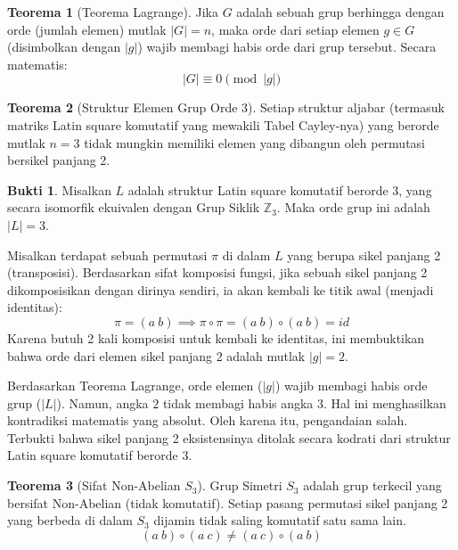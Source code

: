 \documentclass{article}
\theoremstyle{definition}
\newtheorem{teorema}{Teorema}
\newtheorem*{bukti}{Bukti}
\begin{document}
\begin{teorema}[Teorema Lagrange]
  Jika $G$ adalah sebuah grup berhingga dengan orde (jumlah elemen) mutlak $|G| = n$, maka orde dari setiap elemen $g \in G$ (disimbolkan dengan $|g|$) wajib membagi habis orde dari grup tersebut. Secara matematis:
  $$|G| \equiv 0 \pmod{|g|}$$
\end{teorema}

\begin{teorema}[Struktur Elemen Grup Orde 3]
  Setiap struktur aljabar (termasuk matriks Latin square komutatif yang mewakili Tabel Cayley-nya) yang berorde mutlak $n=3$ tidak mungkin memiliki elemen yang dibangun oleh permutasi bersikel panjang 2.
\end{teorema}

\begin{bukti}
  Misalkan $L$ adalah struktur Latin square komutatif berorde 3, yang secara isomorfik ekuivalen dengan Grup Siklik $\mathbb{Z}_3$. Maka orde grup ini adalah $|L| = 3$.

  Misalkan terdapat sebuah permutasi $\pi$ di dalam $L$ yang berupa sikel panjang 2 (transposisi). Berdasarkan sifat komposisi fungsi, jika sebuah sikel panjang 2 dikomposisikan dengan dirinya sendiri, ia akan kembali ke titik awal (menjadi identitas):
  $$\pi = (a\ b) \implies \pi \circ \pi = (a\ b) \circ (a\ b) = id$$
  Karena butuh 2 kali komposisi untuk kembali ke identitas, ini membuktikan bahwa orde dari elemen sikel panjang 2 adalah mutlak $|g| = 2$.

  Berdasarkan Teorema Lagrange, orde elemen ($|g|$) wajib membagi habis orde grup ($|L|$). Namun, angka $2$ tidak membagi habis angka $3$.
  Hal ini menghasilkan kontradiksi matematis yang absolut. Oleh karena itu, pengandaian salah. Terbukti bahwa sikel panjang 2 eksistensinya ditolak secara kodrati dari struktur Latin square komutatif berorde 3.
\end{bukti}

\begin{teorema}[Sifat Non-Abelian $S_3$]
  Grup Simetri $S_3$ adalah grup terkecil yang bersifat Non-Abelian (tidak komutatif). Setiap pasang permutasi sikel panjang 2 yang berbeda di dalam $S_3$ dijamin tidak saling komutatif satu sama lain.
  $$(a\ b) \circ (a\ c) \neq (a\ c) \circ (a\ b)$$
\end{teorema}
\end{document}
